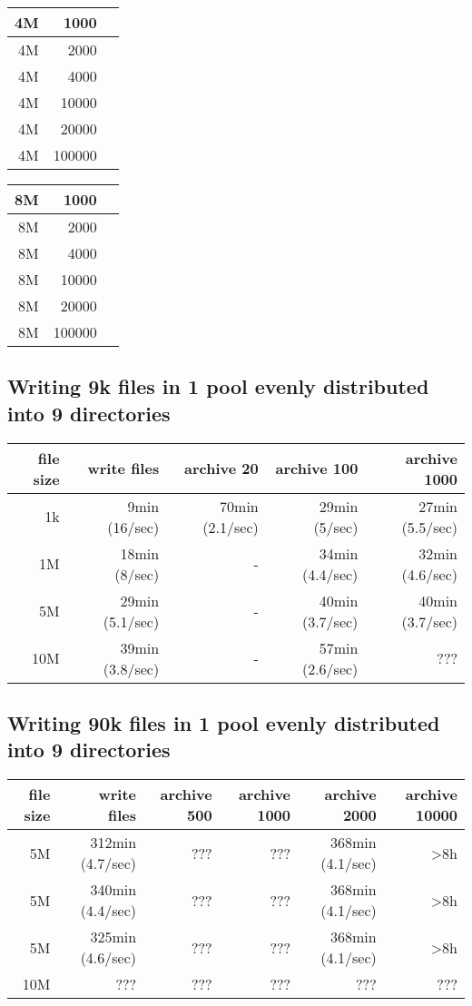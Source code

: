 \documentclass[a4paper,8pt]{scrartcl}
\begin{document}
\begin{tabular}{|r||r||r|}
  \hline
  4M & 1000 & \\
  \hline
  4M & 2000 &\\
  \hline
  4M & 4000 &\\
  \hline
  4M & 10000 &\\
  \hline
  4M & 20000 &\\
  \hline
  4M & 100000 &\\
  \hline
\end{tabular}

\begin{tabular}{|r||r||r|}
  \hline
  8M & 1000 & \\
  \hline
  8M & 2000 &\\
  \hline
  8M & 4000 &\\
  \hline
  8M & 10000 &\\
  \hline
  8M & 20000 &\\
  \hline
  8M & 100000 &\\
  \hline
\end{tabular}


\subsection{Writing 9k files in 1 pool evenly distributed into 9 directories}

\begin{tabular}{|r||r||r|r|r|}
  \hline
  file size & write files  & archive 20 & archive 100 & archive 1000 \\
  \hline
  1k        &  9min (16/sec)  & 70min (2.1/sec) & 29min (5/sec) & 27min (5.5/sec) \\
  \hline
  1M        & 18min (8/sec)   &        -        & 34min (4.4/sec) & 32min (4.6/sec) \\
  \hline
  5M        & 29min (5.1/sec) &        -        & 40min (3.7/sec) & 40min (3.7/sec) \\
  \hline
  10M       & 39min (3.8/sec) &        -        & 57min (2.6/sec) & ??? \\
  \hline
\end{tabular}

\subsection{Writing 90k files in 1 pool evenly distributed into 9 directories}

\begin{tabular}{|r||r||r|r|r|r|}
  \hline
  file size & write files  & archive 500 & archive 1000 & archive 2000 & archive 10000 \\
  \hline
  5M        & 312min (4.7/sec) & ??? & ??? & 368min (4.1/sec) & >8h \\
  5M        & 340min (4.4/sec) & ??? & ??? & 368min (4.1/sec) & >8h \\
  5M        & 325min (4.6/sec) & ??? & ??? & 368min (4.1/sec) & >8h \\
  \hline
  10M       & ??? & ??? & ??? & ??? & ??? \\
  \hline
\end{tabular}
\end{document}
